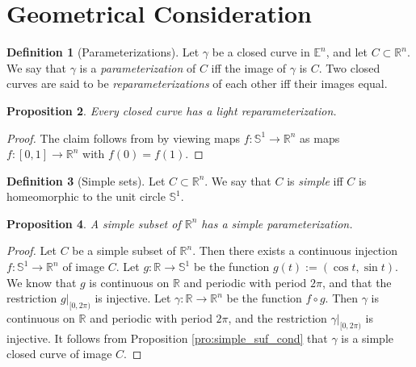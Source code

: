 \documentclass{amsart}
\newtheorem{proposition}{Proposition}[section]
\theoremstyle{definition}
\newtheorem{definition}[proposition]{Definition}
\theoremstyle{remark}
\begin{document}
\section{Geometrical Consideration}
\label{sec:geometrical_consideration}

\begin{definition}[Parameterizations]
    Let $\gamma$ be a closed curve in $\mathbb{E}^n$,
    and let $C\subset\mathbb{R}^n$.
    We say that $\gamma$ is a \emph{parameterization}
    of $C$ iff the image of $\gamma$ is $C$.
    Two closed curves are said to be
    \emph{reparameterizations} of each other
    iff their images equal.
\end{definition}

\begin{proposition}
    \label{pro:light_repar}
    Every closed curve has a light reparameterization.
\end{proposition}

\begin{proof}
    The claim follows from \cite[Corollary 13.4]{nadler}
    by viewing maps $f:\mathbb{S}^1\to\mathbb{R}^n$
    as maps $f:[0,1]\to\mathbb{R}^n$ with $f(0)=f(1)$.
\end{proof}

\begin{definition}[Simple sets]
    Let $C\subset\mathbb{R}^n$.
    We say that $C$ is \emph{simple}
    iff $C$ is homeomorphic to
    the unit circle $\mathbb{S}^1$.
\end{definition}

\begin{proposition}
    \label{pro:simple_par}
    A simple subset of $\mathbb{R}^n$ has
    a simple parameterization.
\end{proposition}

\begin{proof}
    Let $C$ be a simple subset of $\mathbb{R}^n$.
    Then there exists a continuous injection
    $f:\mathbb{S}^1\to\mathbb{R}^n$ of image $C$.
    Let $g:\mathbb{R}\to\mathbb{S}^1$ be the function
    $g(t):=(\cos t,\sin t)$. We know that $g$ is continuous
    on $\mathbb{R}$ and periodic with period $2\pi$, and that
    the restriction $g|_{[0,2\pi)}$ is injective.
    Let $\gamma:\mathbb{R}\to\mathbb{R}^n$ be the function
    $f\circ g$. Then $\gamma$ is continuous
    on $\mathbb{R}$ and periodic with period $2\pi$, and the
    restriction $\gamma|_{[0,2\pi)}$ is injective.
    It follows from Proposition \ref{pro:simple_suf_cond}
    that $\gamma$ is a simple closed curve of image $C$.
\end{proof}
\end{document}
